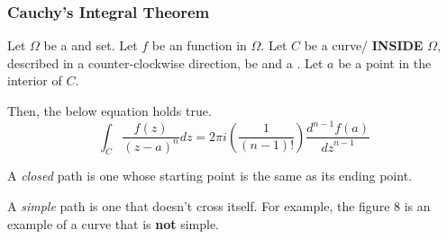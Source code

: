 \subsubsection{Cauchy's Integral Theorem}\label{subsubsec:Cauchys_Integral_Theorem}
\begin{theorem}\label{thm:Cauchys_Integral_Theorem}
  Let $\Omega$ be a  and  set.
  Let $f$ be an  function in $\Omega$.
  Let $C$ be a curve/ \textbf{INSIDE} $\Omega$, described in a counter-clockwise direction, be  and a .
  Let $a$ be a point in the interior of $C$.

  Then, the below equation holds true.
  \begin{equation}\label{eq:Cauchys_Integral_Theorem}
    \int_{C} \frac{f(z)}{{(z-a)}^{n}} dz = 2 \pi i \left( \frac{1}{(n-1)!} \right) \frac{ d^{n-1} f(a)}{{dz}^{n-1}}
  \end{equation}
\end{theorem}

\begin{definition}[Closed]\label{def:Closed_Path}
  A \emph{closed} path is one whose starting point is the same as its ending point.
\end{definition}

\begin{definition}[Simple]\label{def:Simple_Path}
  A \emph{simple} path is one that doesn't cross itself.
  For example, the figure $8$ is an example of a curve that is \textbf{not} simple.
\end{definition}

